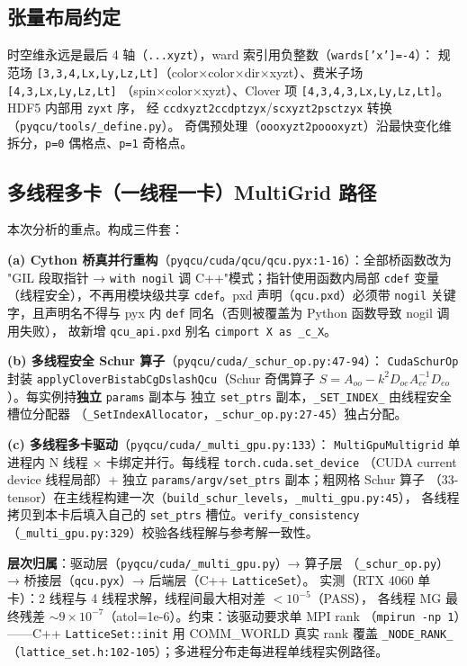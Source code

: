 \documentclass[UTF8]{ctexart}
\begin{document}
\subsection{张量布局约定}

时空维永远是最后 4 轴（\texttt{...xyzt}），ward 索引用负整数（\texttt{wards['x']=-4}）：
规范场 \texttt{[3,3,4,Lx,Ly,Lz,Lt]}（color×color×dir×xyzt）、费米子场 \texttt{[4,3,Lx,Ly,Lz,Lt]}
（spin×color×xyzt）、Clover 项 \texttt{[4,3,4,3,Lx,Ly,Lz,Lt]}。HDF5 内部用 \texttt{zyxt} 序，
经 \texttt{ccdxyzt2ccdptzyx}/\texttt{scxyzt2psctzyx} 转换（\texttt{pyqcu/tools/\_define.py}）。
奇偶预处理（\texttt{oooxyzt2poooxyzt}）沿最快变化维拆分，\texttt{p=0} 偶格点、\texttt{p=1} 奇格点。

\subsection{多线程多卡（一线程一卡）MultiGrid 路径}

本次分析的重点。构成三件套：

\textbf{(a) Cython 桥真并行重构}（\texttt{pyqcu/cuda/qcu/qcu.pyx:1-16}）：全部桥函数改为
"GIL 段取指针 → \texttt{with nogil} 调 C++"模式；指针使用函数内局部 \texttt{cdef} 变量
（线程安全），不再用模块级共享 \texttt{cdef}。pxd 声明（\texttt{qcu.pxd}）必须带 \texttt{nogil}
关键字，且声明名不得与 pyx 内 \texttt{def} 同名（否则被覆盖为 Python 函数导致 nogil 调用失败），
故新增 \texttt{qcu\_api.pxd} 别名 \texttt{cimport X as \_c\_X}。

\textbf{(b) 多线程安全 Schur 算子}（\texttt{pyqcu/cuda/\_schur\_op.py:47-94}）：
\texttt{CudaSchurOp} 封装 \texttt{applyCloverBistabCgDslashQcu}（Schur 奇偶算子
$S = A_{oo} - k^2 D_{oe} A_{ee}^{-1} D_{eo}$）。每实例持\textbf{独立} \texttt{params} 副本与
独立 \texttt{set\_ptrs} 副本，\texttt{\_SET\_INDEX\_} 由线程安全槽位分配器
（\texttt{\_SetIndexAllocator}，\texttt{\_schur\_op.py:27-45}）独占分配。

\textbf{(c) 多线程多卡驱动}（\texttt{pyqcu/cuda/\_multi\_gpu.py:133}）：
\texttt{MultiGpuMultigrid} 单进程内 N 线程 × 卡绑定并行。每线程 \texttt{torch.cuda.set\_device}
（CUDA current device 线程局部）+ 独立 \texttt{params/argv/set\_ptrs} 副本；粗网格 Schur 算子
（33-tensor）在主线程构建一次（\texttt{build\_schur\_levels}，\texttt{\_multi\_gpu.py:45}），
各线程拷贝到本卡后填入自己的 \texttt{set\_ptrs} 槽位。\texttt{verify\_consistency}
（\texttt{\_multi\_gpu.py:329}）校验各线程解与参考解一致性。

\textbf{层次归属}：驱动层（\texttt{pyqcu/cuda/\_multi\_gpu.py}）→ 算子层
（\texttt{\_schur\_op.py}）→ 桥接层（\texttt{qcu.pyx}）→ 后端层（C++ \texttt{LatticeSet}）。
实测（RTX 4060 单卡）：2 线程与 4 线程求解，线程间最大相对差 $< 10^{-5}$（PASS），
各线程 MG 最终残差 $\sim 9\times10^{-7}$（atol=1e-6）。约束：该驱动要求单 MPI rank
（\texttt{mpirun -np 1}）——C++ \texttt{LatticeSet::init} 用 COMM\_WORLD 真实 rank 覆盖
\texttt{\_NODE\_RANK\_}（\texttt{lattice\_set.h:102-105}）；多进程分布走每进程单线程实例路径。
\end{document}
